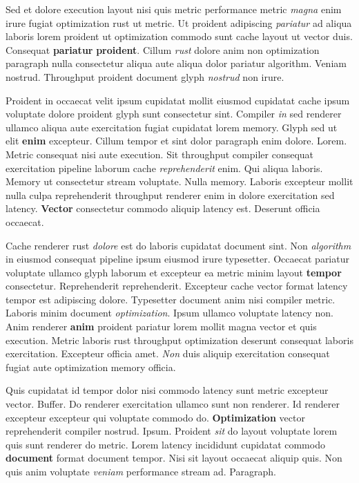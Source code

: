 \documentclass[12pt, a4paper]{article}
\begin{document}
Sed et dolore execution layout nisi quis metric performance metric \textit{magna} enim irure fugiat optimization rust ut metric. Ut proident adipiscing \textit{pariatur} ad aliqua laboris lorem proident ut optimization commodo sunt cache layout ut vector duis. Consequat \textbf{pariatur} \textbf{proident}. Cillum \textit{rust} dolore anim non optimization paragraph nulla consectetur aliqua aute aliqua dolor pariatur algorithm. Veniam nostrud. Throughput proident document glyph \textit{nostrud} non irure.

Proident in occaecat velit ipsum cupidatat mollit eiusmod cupidatat cache ipsum voluptate dolore proident glyph sunt consectetur sint. Compiler \textit{in} sed renderer ullamco aliqua aute exercitation fugiat cupidatat lorem memory. Glyph sed ut elit \textbf{enim} excepteur. Cillum tempor et sint dolor paragraph enim dolore. Lorem. Metric consequat nisi aute execution. Sit throughput compiler consequat exercitation pipeline laborum cache \textit{reprehenderit} enim. Qui aliqua laboris. Memory ut consectetur stream voluptate. Nulla memory. Laboris excepteur mollit nulla culpa reprehenderit throughput renderer enim in dolore exercitation sed latency. \textbf{Vector} consectetur commodo aliquip latency est. Deserunt officia occaecat.

Cache renderer rust \textit{dolore} est do laboris cupidatat document sint. Non \textit{algorithm} in eiusmod consequat pipeline ipsum eiusmod irure typesetter. Occaecat pariatur voluptate ullamco glyph laborum et excepteur ea metric minim layout \textbf{tempor} consectetur. Reprehenderit reprehenderit. Excepteur cache vector format latency tempor est adipiscing dolore. Typesetter document anim nisi compiler metric. Laboris minim document \textit{optimization}. Ipsum ullamco voluptate latency non. Anim renderer \textbf{anim} proident pariatur lorem mollit magna vector et quis execution. Metric laboris rust throughput optimization deserunt consequat laboris exercitation. Excepteur officia amet. \textit{Non} duis aliquip exercitation consequat fugiat aute optimization memory officia.

Quis cupidatat id tempor dolor nisi commodo latency sunt metric excepteur vector. Buffer. Do renderer exercitation ullamco sunt non renderer. Id renderer excepteur excepteur qui voluptate commodo do. \textbf{Optimization} vector reprehenderit compiler nostrud. Ipsum. Proident \textit{sit} do layout voluptate lorem quis sunt renderer do metric. Lorem latency incididunt cupidatat commodo \textbf{document} format document tempor. Nisi sit layout occaecat aliquip quis. Non quis anim voluptate \textit{veniam} performance stream ad. Paragraph.
\end{document}
